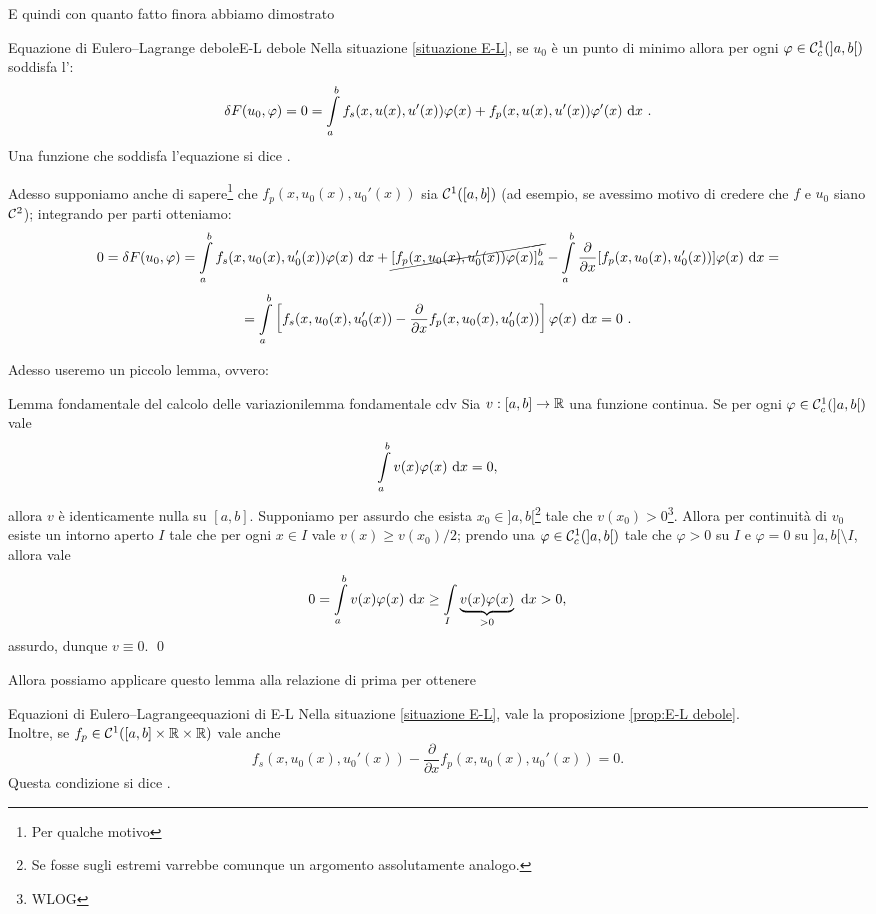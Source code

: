 \documentclass[openany]{book}
\begin{document}
E quindi con quanto fatto finora abbiamo dimostrato 

\begin{proposition}{Equazione di Eulero--Lagrange debole}{E-L debole}
    Nella situazione \ref{situazione E-L}, se $u_0$ è un punto di minimo allora per ogni $\varphi \in \mathcal{C}_c^1(]a,b[)$ soddisfa l':
    \[\delta F(u_0,\varphi) = 0 = \intop_a^b f_s(x,u(x),u'(x))\varphi(x) + f_p(x,u(x),u'(x))\varphi'(x)\de x\ .\]
    Una funzione che soddisfa l'equazione si dice .
\end{proposition}

Adesso supponiamo anche di sapere\footnote{Per qualche motivo} che $f_p(x, u_0(x), u_0'(x))$ sia $\mathcal{C}^1([a,b])$ (ad esempio, se avessimo motivo di credere che $f$ e $u_0$ siano $\mathcal{C}^2$); integrando per parti otteniamo:
\[ 0 = \delta F(u_0,\varphi) = \intop_a^b f_s(x,u_0(x),u_0'(x))\varphi(x)\de x + \cancel{[f_p(x,u_0(x),u_0'(x))\varphi(x)]_a^b} - \intop_a^b \frac{\partial}{\partial x} [f_p(x, u_0(x), u_0'(x))]\varphi(x)\de x = \]
\[ = \intop_a^b \left[ f_s(x,u_0(x),u_0'(x)) - \frac{\partial}{\partial x} f_p(x, u_0(x), u_0'(x)) \right]\varphi(x)\de x = 0\ . \]

Adesso useremo un piccolo lemma, ovvero:

\begin{lemma}{Lemma fondamentale del calcolo delle variazioni}{lemma fondamentale cdv}
    Sia $v : [a,b]\to\mathbb{R}$ una funzione continua. Se per ogni $\varphi \in \mathcal{C}_c^1(]a,b[)$ vale
    \[\intop_a^b v(x)\varphi(x)\de x = 0,\]
    allora $v$ è identicamente nulla su $[a,b]$.
    \proof 
    Supponiamo per assurdo che esista $x_0 \in ]a,b[$\footnote{Se fosse sugli estremi varrebbe comunque un argomento assolutamente analogo.} tale che $v(x_0)>0$\footnote{WLOG}. Allora per continuità di $v_0$ esiste un intorno aperto $I$ tale che per ogni $x \in I$ vale $v(x) \ge v(x_0)/2$; prendo una $\varphi \in \mathcal{C}^1_c(]a,b[)$ tale che $\varphi > 0$ su $I$ e $\varphi = 0$ su $]a,b[\setminus I$, allora vale
    \[ 0 = \intop_a^b v(x) \varphi(x) \de x \ge \intop_I \underbrace{v(x)\varphi(x)}_{>0} \de x > 0, \]
    assurdo, dunque $v \equiv 0$.
    \qed
\end{lemma}

Allora possiamo applicare questo lemma alla relazione di prima per ottenere

\begin{theorem}{Equazioni di Eulero--Lagrange}{equazioni di E-L}
    Nella situazione \ref{situazione E-L}, vale la proposizione \ref{prop:E-L debole}.\\
    Inoltre, se $f_p \in \mathcal{C}^1([a,b]\times \mathbb{R}\times \mathbb{R})$ vale anche
    \[ f_s(x,u_0(x),u_0'(x)) - \frac{\partial}{\partial x} f_p(x, u_0(x), u_0'(x)) = 0.\]
    Questa condizione si dice .
\end{theorem}
\end{document}

